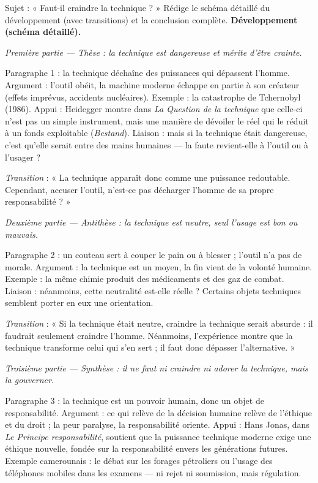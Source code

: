 \documentclass[11pt]{article}
\begin{document}
\begin{exoresolu}
Sujet : « Faut-il craindre la technique ? » Rédige le schéma détaillé du développement (avec transitions) et la conclusion complète.
\tcblower
\textbf{Développement (schéma détaillé).}
\par\smallskip
\emph{Première partie — Thèse : la technique est dangereuse et mérite d'être crainte.}
\par
Paragraphe 1 : la technique déchaîne des puissances qui dépassent l'homme. Argument : l'outil obéit, la machine moderne échappe en partie à son créateur (effets imprévus, accidents nucléaires). Exemple : la catastrophe de Tchernobyl (1986). Appui : Heidegger montre dans \emph{La Question de la technique} que celle-ci n'est pas un simple instrument, mais une manière de \guillemotleft dévoiler \guillemotright le réel qui le réduit à un \guillemotleft fonds exploitable \guillemotright (\emph{Bestand}). Liaison : mais si la technique était dangereuse, c'est qu'elle serait entre des mains humaines — la faute revient-elle à l'outil ou à l'usager ?
\par
\emph{Transition} : « La technique apparaît donc comme une puissance redoutable. Cependant, accuser l'outil, n'est-ce pas décharger l'homme de sa propre responsabilité ? »
\par\smallskip
\emph{Deuxième partie — Antithèse : la technique est neutre, seul l'usage est bon ou mauvais.}
\par
Paragraphe 2 : un couteau sert à couper le pain ou à blesser ; l'outil n'a pas de morale. Argument : la technique est un moyen, la fin vient de la volonté humaine. Exemple : la même chimie produit des médicaments et des gaz de combat. Liaison : néanmoins, cette neutralité est-elle réelle ? Certains objets techniques semblent porter en eux une orientation.
\par
\emph{Transition} : « Si la technique était neutre, craindre la technique serait absurde : il faudrait seulement craindre l'homme. Néanmoins, l'expérience montre que la technique transforme celui qui s'en sert ; il faut donc dépasser l'alternative. »
\par\smallskip
\emph{Troisième partie — Synthèse : il ne faut ni craindre ni adorer la technique, mais la gouverner.}
\par
Paragraphe 3 : la technique est un pouvoir humain, donc un objet de responsabilité. Argument : ce qui relève de la décision humaine relève de l'éthique et du droit ; la peur paralyse, la responsabilité oriente. Appui : Hans Jonas, dans \emph{Le Principe responsabilité}, soutient que la puissance technique moderne exige une éthique nouvelle, fondée sur la responsabilité envers les générations futures. Exemple camerounais : le débat sur les forages pétroliers ou l'usage des téléphones mobiles dans les examens — ni rejet ni soumission, mais régulation.

\end{exoresolu}
\end{document}
